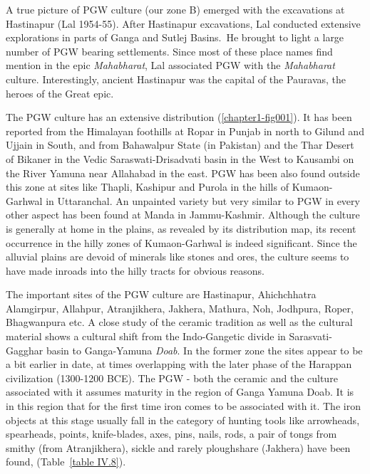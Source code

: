 A true picture of PGW culture (our zone B) emerged with the excavations at Hastinapur (Lal 1954-55). After Hastinapur excavations, Lal conducted extensive explorations in parts of Ganga and Sutlej Basins.~He brought to light a large number of PGW bearing settlements. Since most of these place names find mention in the epic \textit{Mahabharat}, Lal associated PGW with the \textit{Mahabharat} culture. Interestingly, ancient Hastinapur was the capital of the Pauravas, the heroes of the Great epic. 

The PGW culture has an extensive distribution (\ref{chapter1-fig001}). It has been reported from the Himalayan foothills at Ropar in Punjab in north to Gilund and Ujjain in South, and from Bahawalpur State (in Pakistan) and the Thar Desert of Bikaner in the Vedic Saraswati-Drisadvati basin in the West to Kausambi on the River Yamuna near Allahabad in the east. PGW has been also found outside this zone at sites like Thapli, Kashipur and Purola in the hills of Kumaon-Garhwal in Uttaranchal. An unpainted variety but very similar to PGW in every other aspect has been found at Manda in Jammu-Kashmir. Although the culture is generally at home in the plains, as revealed by its distribution map, its recent occurrence in the hilly zones of Kumaon-Garhwal is indeed significant. Since the alluvial plains are devoid of minerals like stones and ores, the culture seems to have made inroads into the hilly tracts for obvious reasons.

The important sites of the PGW culture are Hastinapur, Ahichchhatra Alamgirpur, Allahpur, Atranjikhera, Jakhera, Mathura, Noh, Jodhpura, Roper, Bhagwanpura etc. A close study of the ceramic tradition as well as the cultural material shows a cultural shift from the Indo-Gangetic divide in Sarasvati-Gagghar basin to Ganga-Yamuna \textit{Doab}. In the former zone the sites appear to be a bit earlier in date, at times overlapping with the later phase of the Harappan civilization (1300-1200 BCE). The PGW - both the ceramic and the culture associated with it assumes maturity in the region of Ganga Yamuna Doab. It is in this region that for the first time iron comes to be associated with it.  The iron objects at this stage usually fall in the category of hunting tools like arrowheads, spearheads, points, knife-blades, axes, pins, nails, rods, a pair of tongs from smithy (from Atranjikhera), sickle and rarely ploughshare (Jakhera) have been found, (Table~\ref{table IV.8}). 

